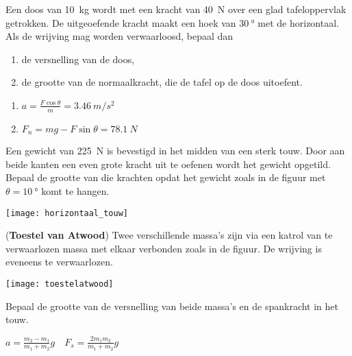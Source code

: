 \documentclass{ximera}
\begin{document}
\begin{exercise}
    Een doos van \SI{10}{kg} wordt met een kracht van \SI{40}{N} over een glad tafeloppervlak getrokken. De uitgeoefende kracht maakt een hoek van $\SI{30}{\degree}$ met de horizontaal. Als de wrijving mag worden verwaarloosd, bepaal dan
   
    \begin{minipage}[t]{.6\linewidth}
        \begin{enumerate}
        \item de versnelling van de doos,
        \item de grootte van de normaalkracht, die de tafel op de doos uitoefent.
        \end{enumerate}
    \end{minipage}
    \begin{minipage}[t]{.4\linewidth}
    \end{minipage}

    \begin{oplossing}
        \begin{enumerate}
            \item $a=\frac{F\cos\theta}{m}=\SI{3,46}{m/s^2}$
            \item $F_n=mg-F\sin\theta=\SI{78,1}{N}$
        \end{enumerate}
    \end{oplossing}
\end{exercise}

\begin{exercise}
    Een gewicht van \SI{225}{N} is bevestigd in het midden van een sterk touw. Door aan beide kanten een even grote kracht uit te oefenen wordt het gewicht opgetild. Bepaal de grootte van die krachten opdat het gewicht zoals in de figuur met $\theta=\SI{10}{\degree}$ komt te hangen.

    \begin{image}
        \texttt{[image: horizontaal\_touw]}
    \end{image}
\end{exercise}
	
\begin{exercise}{(\textbf{Toestel van Atwood})}
    Twee verschillende massa's zijn via een katrol van te verwaarlozen massa met elkaar verbonden zoals in de figuur. De wrijving is eveneens te verwaarlozen. 

    \begin{image}
        \texttt{[image: toestelatwood]}
    \end{image}

    Bepaal de grootte van de versnelling van beide massa's en de spankracht in het touw.

    \begin{oplossing}
        $a=\frac{m_2-m_1}{m_1+m_2}g \quad F_s=\frac{2m_1m_2}{m_1+m_2}g$
    \end{oplossing}
\end{exercise}
\end{document}
